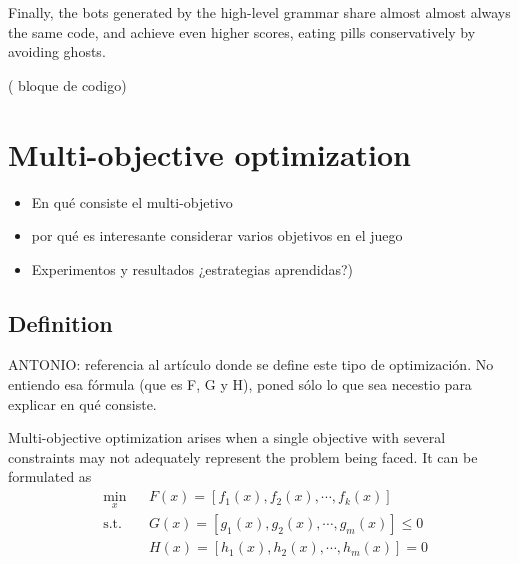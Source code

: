 \documentclass{llncs}
\newcommand{\pacman}{Ms. Pac-Man vs. Ghosts }
\newcommand{\paco}{Pac-Man }
\begin{document}
Finally, the bots generated by the high-level grammar share almost almost always the same code, and achieve even higher scores, eating pills conservatively by avoiding ghosts.


({\color{red} bloque de codigo})

%
\section{Multi-objective optimization}
\label{sec:sec3}
%

\begin{itemize}
\item En qué consiste el multi-objetivo
\item por qué es interesante considerar varios objetivos en el juego
\item Experimentos y resultados  ¿estrategias aprendidas?)
\end{itemize}

\subsection{Definition}

{\color{red}ANTONIO: referencia al artículo donde se define este tipo de optimización. No entiendo esa fórmula (que es F, G y H), poned sólo lo que sea necestio para explicar en qué consiste.}

Multi-objective optimization arises when a single objective with several constraints may not adequately represent the problem being faced. It can be formulated as
\begin{equation}
\begin{aligned}
& \underset{x}{\text{min}}
& & F(x) = [f_1(x), f_2(x), \cdots, f_k(x)] \\
& \text{s.t.} & &  G(x) = [g_1(x), g_2(x), \cdots, g_m(x)] \leq 0 \\
& & &  H(x) = [h_1(x), h_2(x), \cdots, h_m(x)] = 0 \\
\end{aligned}
\end{equation}
\end{document}
